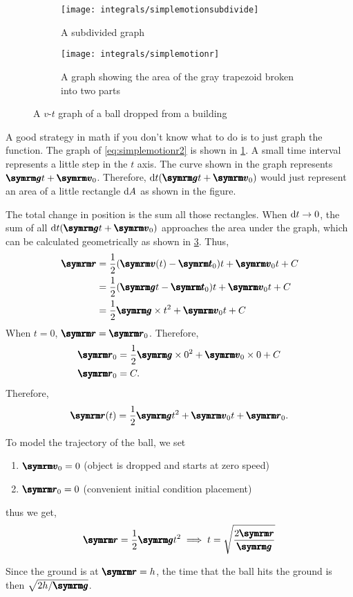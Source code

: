 \begin{figure}[ht]
    \centering
    \begin{subfigure}[b]{0.45\textwidth}
        \centering
        \texttt{[image: integrals/simplemotionsubdivide]}
        \caption{A subdivided graph}
        \label{fig:simplemotionsubdivided}
    \end{subfigure}
    \begin{subfigure}[b]{0.45\textwidth}
        \centering
        \texttt{[image: integrals/simplemotionr]}
        \caption{A graph showing the area of the gray trapezoid broken into two parts}
        \label{fig:simplemotionr}
    \end{subfigure}
    \caption{A $v$-$t$ graph of a ball dropped from a building}
\end{figure}

\begin{multicols}{2}
A good strategy in math if you don't know what to do is to just graph the function. The graph of \cref{eq:simplemotionr2} is shown in \cref{fig:simplemotionsubdivided}. A small time interval represents a little step in the $t$ axis. The curve shown in the graph represents $\vv{g}t + \vv{v}_0$. Therefore, $\odif{t}(\vv{g}t + \vv{v}_0)$ would just represent an area of a little rectangle $\odif{A}$ as shown in the figure.

The total change in position is the sum all those rectangles. When $\odif{t} \appr 0$, the sum of all $\odif{t}(\vv{g}t + \vv{v}_0)$ approaches the area under the graph, which can be calculated geometrically as shown in \cref{fig:simplemotionr}. Thus,
\begin{align}
    \vv{r} &= \frac{1}{2}(\vv{v}(t) - \vv{t}_0)t + \vv{v}_0t + C \\
    &= \frac{1}{2}(\vv{g}t - \vv{t}_0)t + \vv{v}_0t + C \\
    &= \frac{1}{2}\vv{g}\times t^2 + \vv{v}_0t + C
\end{align}
When $t = 0$, $\vv{r} = \vv{r}_0$. Therefore,
\begin{align*}
    \vv{r}_0 &= \frac{1}{2}\vv{g}\times 0^2 + \vv{v}_0\times 0 + C \\
    \vv{r}_0 &= C.
\end{align*}
Therefore,
\begin{equation}
    \vv{r}(t) = \frac{1}{2}\vv{g}t^2 + \vv{v}_0t + \vv{r}_0.
\end{equation}

To model the trajectory of the ball, we set
\begin{enumerate}[noitemsep]
    \item $\vv{v}_0 = 0$ (object is dropped and starts at zero speed)
    \item $\vv{r}_0 = 0$ (convenient initial condition placement)
\end{enumerate}
thus we get,
\begin{gather}
    \vv{r} = \frac{1}{2}\vv{g}t^2 \implies t = \sqrt{\frac{2\vv{r}}{\vv{g}}}
\end{gather}
\end{multicols}
Since the ground is at $\vv{r} = h$, the time that the ball hits the ground is then $\sqrt{2h/\vv{g}}$.

